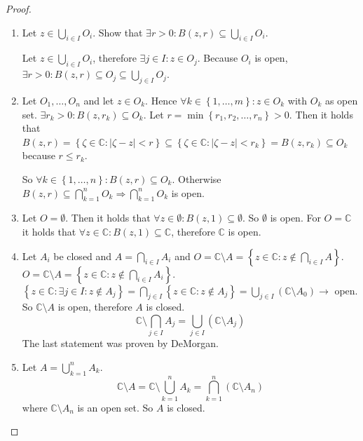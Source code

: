 \documentclass[a4paper,landscape,twocolumn]{article}
\newcommand\set[1]{\left\{#1\right\}}
\newcommand\abs[1]{\left|#1\right|}
\begin{document}
\begin{proof}
  \begin{enumerate}
    \item
      Let $z \in \bigcup_{i \in I} O_i$. Show that $\exists r > 0: B(z, r) \subseteq \bigcup_{i \in I} O_i$.

      Let $z \in \bigcup_{i \in I} O_i$, therefore $\exists j \in I: z \in O_j$.
      Because $O_i$ is open, $\exists r > 0: B(z, r) \subseteq O_j \subseteq \bigcup_{j \in I} O_j$.
    \item
      Let $O_1, \ldots, O_n$ and let $z \in O_k$.
      Hence $\forall k \in \set{1, \dots, m}: z \in O_k$ with $O_k$ as open set.
      $\exists r_k > 0: B(z, r_k) \subseteq O_k$.
      Let $r = \min\set{r_1, r_2, \dots, r_n} > 0$.
      Then it holds that $B(z, r) = \set{\zeta \in \mathbb C: \abs{\zeta - z} < r}
      \subseteq \set{\zeta \in \mathbb C: \abs{\zeta - z} < r_k} = B(z, r_k) \subseteq O_k$ because $r \leq r_k$.

      So $\forall k \in \set{1, \dots, n}: B(z, r) \subseteq O_k$. Otherwise $B(z, r) \subseteq \bigcap_{k=1}^n O_k \Rightarrow \bigcap_{k=1}^n O_k$ is open.
    \item
      Let $O = \emptyset$. Then it holds that $\forall z \in \emptyset: B(z, 1) \subseteq \emptyset$.
      So $\emptyset$ is open.
      For $O = \mathbb C$ it holds that $\forall z \in \mathbb C: B(z, 1) \subseteq \mathbb C$,
      therefore $\mathbb C$ is open.
    \item
      Let $A_i$ be closed and $A = \bigcap_{i \in I} A_i$ and $O = \mathbb C \setminus A = \set{z \in \mathbb C: z \not\in \bigcap_{i \in I} A}$. $O = \mathbb C \setminus A = \set{z \in \mathbb C: z \not\in \bigcap_{i \in I} A_i}$.
      $\set{z \in \mathbb C: \exists j \in I: z \not\in A_j} = \bigcap_{j \in I} \set{z \in \mathbb C: z \not\in A_j}
      = \bigcup_{j \in I} \left(\mathbb C \setminus A_0\right) \to$ open.
      So $\mathbb C \setminus A$ is open, therefore $A$ is closed.
      \[ \mathbb C \setminus \bigcap_{j \in I} A_j = \bigcup_{j \in I} (\mathbb C \setminus A_j) \]
      The last statement was proven by DeMorgan.
    \item
      Let $A = \bigcup_{k=1}^n A_k$.
      \[ \mathbb C \setminus A = \mathbb C \setminus \bigcup_{k=1}^n A_k = \bigcap_{k=1}^n (\mathbb C \setminus A_n) \]
      where $\mathbb C \setminus A_n$ is an open set.
      So $A$ is closed.
  \end{enumerate}
\end{proof}
\end{document}
